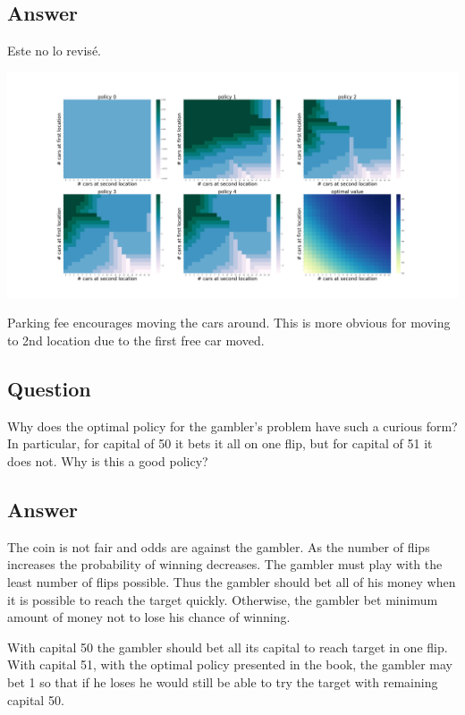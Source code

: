 \documentclass[11pt]{article}
\def\red{\color{red}}
\begin{document}
    \subsection*{Answer}

    {\red Este no lo revisé.}

    \includegraphics[scale=0.15]{figure_4_2_e_4_7}

    Parking fee encourages moving the cars around.
    This is more obvious for moving to 2nd location due to the first free car moved.

    \subsection{Question}

    Why does the optimal policy for the gambler’s problem have such a curious form?
    In particular, for capital of 50 it bets it all on one flip, but for capital of 51 it does not.
    Why is this a good policy?

    \subsection*{Answer}

    The coin is not fair and odds are against the gambler.
    As the number of flips increases the probability of winning decreases.
    The gambler must play with the least number of flips possible.
    Thus the gambler should bet all of his money when it is possible to reach the target quickly.
    Otherwise, the gambler bet minimum amount of money not to lose his chance of winning.

    With capital 50 the gambler should bet all its capital to reach target in one flip.
    With capital 51, with the optimal policy presented in the book, the gambler may bet 1 so that if he loses he would still be able to try the target with remaining capital 50.
\end{document}
